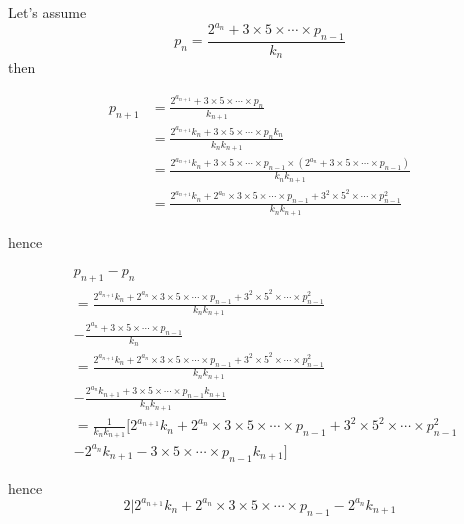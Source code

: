 \documentclass{article}
\newcommand{\eqn}[1]{
\[\begin{split}
#1
\end{split}\]
}
\begin{document}
\Large

Let's assume
$$
p_n=\frac{2^{a_n}+3\times5\times\cdots\times p_{n-1}}{k_n}
$$
then
\eqn{
p_{n+1}&=\frac{2^{a_{n+1}}+3\times5\times\cdots\times p_{n}}{k_{n+1}}
\\&=
\frac{2^{a_{n+1}}k_n+3\times5\times\cdots\times p_{n}k_n}{k_nk_{n+1}}
\\&=
\frac{2^{a_{n+1}}k_n+3\times5\times\cdots\times p_{n-1}\times (2^{a_n}+3\times5\times\cdots\times p_{n-1})}{k_nk_{n+1}}
\\&=
\frac{2^{a_{n+1}}k_n+2^{a_n}\times 3\times5\times\cdots\times p_{n-1}+3^2\times5^2\times\cdots\times p_{n-1}^2}{k_nk_{n+1}}
}
hence
\eqn{
&
p_{n+1}-p_n
\\&=
\frac{2^{a_{n+1}}k_n+2^{a_n}\times 3\times5\times\cdots\times p_{n-1}+3^2\times5^2\times\cdots\times p_{n-1}^2}{k_nk_{n+1}}
\\&-
\frac{2^{a_n}+3\times5\times\cdots\times p_{n-1}}{k_n}
\\&=
\frac{2^{a_{n+1}}k_n+2^{a_n}\times 3\times5\times\cdots\times p_{n-1}+3^2\times5^2\times\cdots\times p_{n-1}^2}{k_nk_{n+1}}
\\&-
\frac{2^{a_n}k_{n+1}+3\times5\times\cdots\times p_{n-1}k_{n+1}}{k_nk_{n+1}}
\\&=
\frac{1}{k_nk_{n+1}}[
2^{a_{n+1}}k_n+2^{a_n}\times 3\times5\times\cdots\times p_{n-1}+3^2\times5^2\times\cdots\times p_{n-1}^2
\\&-
2^{a_n}k_{n+1}-3\times5\times\cdots\times p_{n-1}k_{n+1}
]
}
hence
$$
2|
2^{a_{n+1}}k_n+2^{a_n}\times 3\times5\times\cdots\times p_{n-1}
-
2^{a_n}k_{n+1}
$$
\end{document}
